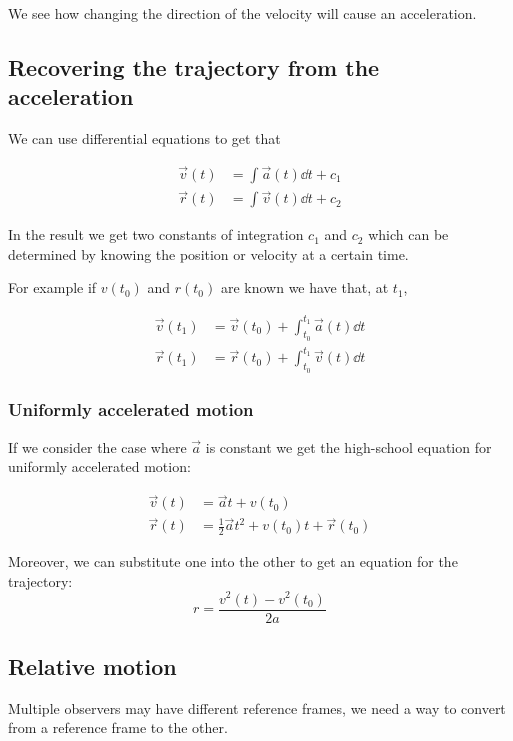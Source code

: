 \documentclass[10pt]{extarticle}
\begin{document}
We see how changing the direction of the velocity will cause an acceleration.

\subsection{Recovering the trajectory from the acceleration}

We can use differential equations to get that

\begin{align*}
    \vec{v}(t) & = \int \vec{a}(t) \dd{t} + c_1 \\
    \vec{r}(t) & = \int \vec{v}(t) \dd{t} + c_2
\end{align*}

In the result we get two constants of integration $c_1$ and $c_2$
which can be determined by knowing the position or velocity at a certain time.

For example if $v(t_0)$ and $r(t_0)$ are known we have that, at $t_1$,

\begin{align*}
    \vec{v}(t_1) & = \vec{v}(t_0) + \int_{t_0}^{t_1} \vec{a}(t) \dd{t} \\
    \vec{r}(t_1) & = \vec{r}(t_0) + \int_{t_0}^{t_1} \vec{v}(t) \dd{t}
\end{align*}

\subsubsection{Uniformly accelerated motion}

If we consider the case where $\vec{a}$ is constant we get
the high-school equation for uniformly accelerated motion:

\begin{align*}
    \vec{v}(t) & = \vec{a} t + v(t_0)                                \\
    \vec{r}(t) & = \frac{1}{2} \vec{a} t^2 + v(t_0) t + \vec{r}(t_0)
\end{align*}

Moreover, we can substitute one into the other to get an equation for the trajectory:
$$
    r = \frac{v^2(t) - v^2(t_0)}{2a}
$$

\subsection{Relative motion}

Multiple observers may have different reference frames,
we need a way to convert from a reference frame to the other.
\end{document}
